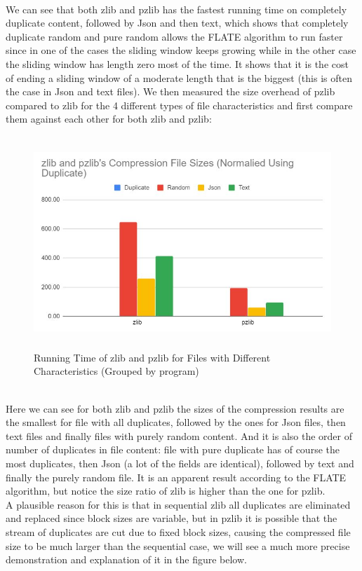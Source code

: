 \documentclass[12pt]{article}
\begin{document}
    ~\\
    We can see that both zlib and pzlib has the fastest running time on completely duplicate content, followed by Json and then text, which shows that completely duplicate random and pure random allows the FLATE algorithm to run faster since in one of the cases the sliding window keeps growing while in the other case the sliding window has length zero most of the time. It shows that it is the cost of ending a sliding window of a moderate length that is the biggest (this is often the case in Json and text files).
    We then measured the size overhead of pzlib compared to zlib for the 4 different types of file characteristics and first compare them against each other for both zlib and pzlib:
    \begin{figure}[!h]
    \begin{center}
    \includegraphics[height=8cm]{CompressionSizeFileChars1.JPG}
    \caption{Running Time of zlib and pzlib for Files with Different Characteristics (Grouped by program)}
    \end{center}
    \end{figure}
    ~\\
    Here we can see for both zlib and pzlib the sizes of the compression results are the smallest for file with all duplicates, followed by the ones for Json files, then text files and finally files with purely random content. And it is also the order of number of duplicates in file content: file with pure duplicate has of course the most duplicates, then Json (a lot of the fields are identical), followed by text and finally the purely random file.
    It is an apparent result according to the FLATE algorithm, but notice the size ratio of zlib is higher than the one for pzlib.\\
    A plausible reason for this is that in sequential zlib all duplicates are eliminated and replaced since block sizes are variable, but in pzlib it is possible that the stream of duplicates are cut due to fixed block sizes, causing the compressed file size to be much larger than the sequential case, we will see a much more precise demonstration and explanation of it in the figure below.\\
\end{document}
